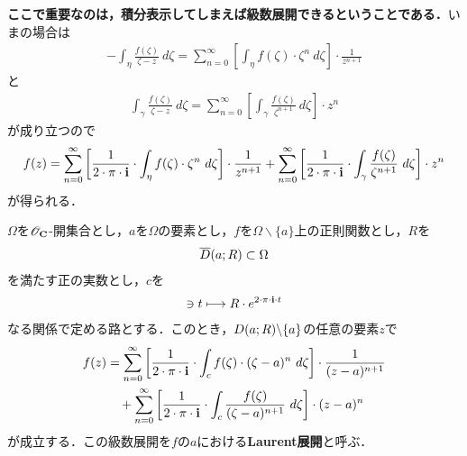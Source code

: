 	{\bf ここで重要なのは，積分表示してしまえば級数展開できるということである．}いまの場合は
	\begin{align}
		-\int_{\eta} \frac{f(\zeta)}{\zeta - z}\ d\zeta
		= \sum_{n=0}^{\infty} \left[ \int_{\eta} f(\zeta) \cdot \zeta^{n}\ d\zeta \right] \cdot \frac{1}{z^{n+1}}
	\end{align}
	と
	\begin{align}
		\int_{\gamma} \frac{f(\zeta)}{\zeta - z}\ d\zeta
		= \sum_{n=0}^{\infty} \left[ \int_{\gamma} \frac{f(\zeta)}{\zeta^{n+1}}\ d\zeta \right] \cdot z^{n}
	\end{align}
	が成り立つので
	\begin{align}
		f(z) = \sum_{n=0}^{\infty} \left[ \frac{1}{2\cdot\pi\cdot\mathbf{i}} \cdot \int_{\eta} f(\zeta) \cdot \zeta^{n}\ d\zeta \right] \cdot \frac{1}{z^{n+1}}
		+ \sum_{n=0}^{\infty} \left[ \frac{1}{2\cdot\pi\cdot\mathbf{i}} \cdot \int_{\gamma} \frac{f(\zeta)}{\zeta^{n+1}}\ d\zeta \right] \cdot z^{n}
	\end{align}
	が得られる．
	
	\begin{screen}
		\begin{thm}[Laurent展開]
			$\Omega$を$\mathscr{O}_{\mathbf{C}}$-開集合とし，$a$を$\Omega$の要素とし，$f$を$\Omega \backslash \{a\}$上の正則関数とし，$R$を
			\begin{align}
				\overline{D}(a;R) \subset \Omega
			\end{align}
			を満たす正の実数とし，$c$を
			\begin{align}
				[0,1] \ni t \longmapsto R \cdot e^{2 \cdot \pi \cdot \isym \cdot t}
			\end{align}
			なる関係で定める路とする．このとき，$D(a;R) \backslash \{a\}$の任意の要素$z$で
			\begin{align}
				f(z) &= \sum_{n=0}^{\infty} \left[ \frac{1}{2\cdot\pi\cdot\mathbf{i}} \cdot \int_{c} f(\zeta) \cdot (\zeta-a)^{n}\ d\zeta \right] \cdot \frac{1}{(z-a)^{n+1}} \\
				&\quad + \sum_{n=0}^{\infty} \left[ \frac{1}{2\cdot\pi\cdot\mathbf{i}} \cdot \int_{c} \frac{f(\zeta)}{(\zeta-a)^{n+1}}\ d\zeta \right] \cdot (z-a)^{n}
			\end{align}
			が成立する．この級数展開を$f$の$a$における{\bf Laurent展開}と呼ぶ．
		\end{thm}
	\end{screen}
	
